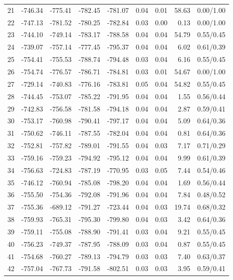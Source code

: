 \begin{tabular}{lrrrrrrrr}
21 & -746.34 & -775.41 & -782.45 & -781.07 & 0.04 & 0.01 & 58.63 & 0.00/1.00 \\
22 & -747.13 & -781.52 & -780.25 & -782.84 & 0.03 & 0.00 & 0.13 & 0.00/1.00 \\
23 & -744.10 & -749.14 & -783.17 & -788.58 & 0.04 & 0.04 & 54.79 & 0.55/0.45 \\
24 & -739.07 & -757.14 & -777.45 & -795.37 & 0.04 & 0.04 & 6.02 & 0.61/0.39 \\
25 & -754.41 & -755.53 & -788.74 & -794.48 & 0.03 & 0.04 & 6.16 & 0.55/0.45 \\
26 & -754.74 & -776.57 & -786.71 & -784.81 & 0.03 & 0.01 & 54.67 & 0.00/1.00 \\
27 & -729.14 & -740.83 & -776.16 & -783.81 & 0.05 & 0.04 & 54.82 & 0.55/0.45 \\
28 & -744.45 & -753.07 & -785.22 & -791.95 & 0.04 & 0.04 & 1.55 & 0.56/0.44 \\
29 & -742.83 & -756.58 & -781.58 & -794.18 & 0.04 & 0.04 & 2.87 & 0.59/0.41 \\
30 & -753.17 & -760.98 & -790.41 & -797.17 & 0.04 & 0.04 & 5.09 & 0.64/0.36 \\
31 & -750.62 & -746.11 & -787.55 & -782.04 & 0.04 & 0.04 & 0.81 & 0.64/0.36 \\
32 & -752.81 & -757.82 & -789.01 & -791.55 & 0.04 & 0.03 & 7.17 & 0.71/0.29 \\
33 & -759.16 & -759.23 & -794.92 & -795.12 & 0.04 & 0.04 & 9.99 & 0.61/0.39 \\
34 & -756.63 & -724.83 & -787.19 & -770.95 & 0.03 & 0.05 & 7.44 & 0.54/0.46 \\
35 & -746.12 & -760.94 & -785.08 & -798.20 & 0.04 & 0.04 & 1.69 & 0.56/0.44 \\
36 & -755.50 & -754.36 & -792.08 & -791.96 & 0.04 & 0.04 & 7.84 & 0.48/0.52 \\
37 & -755.36 & -689.12 & -791.27 & -723.44 & 0.04 & 0.03 & 19.74 & 0.68/0.32 \\
38 & -759.93 & -765.31 & -795.30 & -799.80 & 0.04 & 0.03 & 3.42 & 0.64/0.36 \\
39 & -759.11 & -755.08 & -788.90 & -791.41 & 0.03 & 0.04 & 9.21 & 0.55/0.45 \\
40 & -756.23 & -749.37 & -787.95 & -788.09 & 0.03 & 0.04 & 0.87 & 0.55/0.45 \\
41 & -754.68 & -760.27 & -789.13 & -794.79 & 0.03 & 0.03 & 7.40 & 0.63/0.37 \\
42 & -757.04 & -767.73 & -791.58 & -802.51 & 0.03 & 0.03 & 3.95 & 0.59/0.41 \\

\end{tabular}
